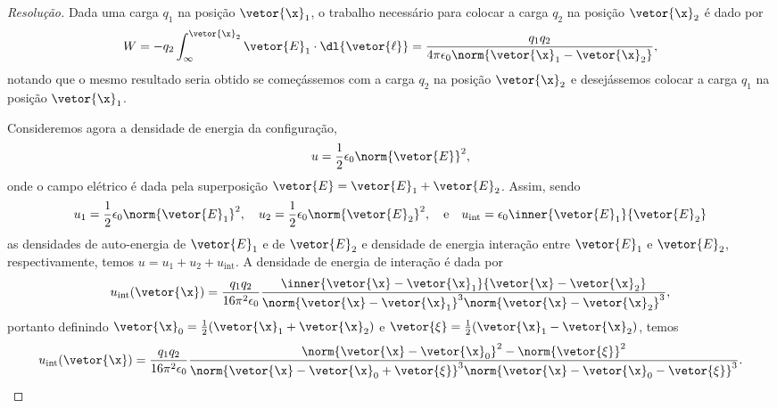 \begin{proof}[Resolução]
    Dada uma carga \(q_1\) na posição \(\vetor{\x}_1\), o trabalho necessário para colocar a carga \(q_2\) na posição \(\vetor{\x}_2\) é dado por
    \begin{equation*}
        W = - q_2 \int_\infty^{\vetor{\x}_2} \vetor{E}_1 \cdot \dl{\vetor{\ell}} = \frac{q_1q_2}{4\pi \epsilon_0 \norm{\vetor{\x}_1 - \vetor{\x}_2}},
    \end{equation*}
    notando que o mesmo resultado seria obtido se começássemos com a carga \(q_2\) na posição \(\vetor{\x}_2\) e desejássemos colocar a carga \(q_1\) na posição \(\vetor{\x}_1\).

    Consideremos agora a densidade de energia da configuração,
    \begin{equation*}
        u = \frac12 \epsilon_0 \norm{\vetor{E}}^2,
    \end{equation*}
    onde o campo elétrico é dada pela superposição \(\vetor{E} = \vetor{E}_1 + \vetor{E}_2\). Assim, sendo
    \begin{equation*}
        u_1 = \frac12 \epsilon_0 \norm{\vetor{E}_1}^2,\quad
        u_2 = \frac12 \epsilon_0 \norm{\vetor{E}_2}^2,\quad\text{e}\quad
        u_\mathrm{int} = \epsilon_0 \inner{\vetor{E}_1}{\vetor{E}_2}
    \end{equation*}
    as densidades de auto-energia de \(\vetor{E}_1\) e de \(\vetor{E}_2\) e densidade de energia interação entre \(\vetor{E}_1\) e \(\vetor{E}_2\), respectivamente, temos \(u = u_1 + u_2 + u_\mathrm{int}\). A densidade de energia de interação é dada por
    \begin{equation*}
        u_\mathrm{int}(\vetor{\x}) = \frac{q_1q_2}{16\pi^2 \epsilon_0} \frac{\inner{\vetor{\x} - \vetor{\x}_1}{\vetor{\x} - \vetor{\x}_2}}{\norm{\vetor{\x}- \vetor{\x}_1}^3 \norm{\vetor{\x} - \vetor{\x}_2}^3},
    \end{equation*}
    portanto definindo \(\vetor{\x}_0 = \frac12 (\vetor{\x}_1 + \vetor{\x}_2)\) e \(\vetor{\xi} = \frac12 (\vetor{\x}_1 - \vetor{\x}_2)\), temos
    \begin{equation*}
        u_\mathrm{int}(\vetor{\x}) = \frac{q_1q_2}{16\pi^2 \epsilon_0}\frac{\norm{\vetor{\x} - \vetor{\x}_0}^2 - \norm{\vetor{\xi}}^2}{\norm{\vetor{\x} - \vetor{\x}_0 + \vetor{\xi}}^3\norm{\vetor{\x} - \vetor{\x}_0 - \vetor{\xi}}^3}.
    \end{equation*}
\end{proof}
